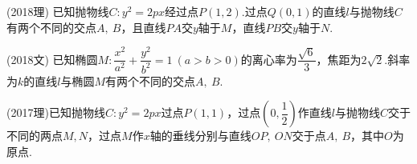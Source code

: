 \documentclass{BHCexam}
\begin{document}
\fubiaoti{}
\maketitle
 \begin{questions}
\question (2018理) 已知抛物线$C:y^2=2px$经过点$P(1,2)$.过点$Q(0,1)$的直线$l$与抛物线$C$有两个不同的交点$A,~B$，且直线$PA$交$y$轴于$M$，直线$PB$交$y$轴于$N$.
\kongbai
\qs (2018文)
已知椭圆$M:\dfrac{x^2}{a^2}+\dfrac{y^2}{b^2}=1~(a>b>0)$的离心率为$\dfrac{\sqrt{6}}{3}$，焦距为$2\sqrt{2}$.斜率为$k$的直线$l$与椭圆$M$有两个不同的交点$A,~B$.
\qs (2017理)已知抛物线$ C:y^2=2px $过点$ P\left(1,1\right) $，过点$ \left(0,\dfrac{1}{2}\right) $作直线$ l $与抛物线$ C $交于不同的两点$ M,N $，过点$ M $作$x$轴的垂线分别与直线$ OP,\ ON $交于点$ A,\ B $，其中$ O $为原点.


\end{questions}
\end{document}
